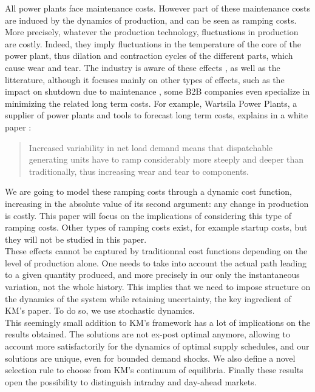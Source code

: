 All power plants face maintenance costs. However part of these maintenance costs are induced by the dynamics of production, and can be seen as ramping costs. More precisely, whatever the production technology, fluctuations in production are costly. Indeed, they imply fluctuations in the temperature of the core of the power plant, thus dilation and contraction cycles of the different parts, which cause wear and tear. The industry is aware of these effects \cite{GE}, as well as the litterature, although it focuses mainly on other types of effects, such as the impact on shutdown due to maintenance \cite{rothwell1995dynamic}, some B2B companies even specialize in minimizing the related long term costs. For example, Wartsila Power Plants, a supplier of power plants and tools to forecast long term costs, explains in a white paper \cite{Arima}: 
\begin{quote}
Increased variability in net load demand means that dispatchable generating units have to ramp considerably more steeply and deeper than traditionally, thus increasing wear and tear to components.
\end{quote}
We are going to model these ramping costs through a dynamic cost function, increasing in the absolute value of its second argument: any change in production is costly. This paper will focus on the implications of considering this type of ramping costs. Other types of ramping costs exist, for example startup costs, but they will not be studied in this paper. \\

These effects cannot be captured by traditionnal cost functions depending on the level of production alone. One needs to take into account the actual path leading to a given quantity produced, and more precisely in our only the instantaneous variation, not the whole history. This implies that we need to impose structure on the dynamics of the system while retaining uncertainty, the key ingredient of KM's paper. To do so, we use stochastic dynamics. \\

This seemingly small addition to KM's framework has a lot of implications on the results obtained. The solutions are not ex-post optimal anymore, allowing to account more satisfactorily for the dynamics of optimal supply schedules, and our solutions are unique, even for bounded demand shocks. We also define a novel selection rule to choose from KM's continuum of equilibria. Finally these results open the possibility to distinguish intraday and day-ahead markets. \\ 

